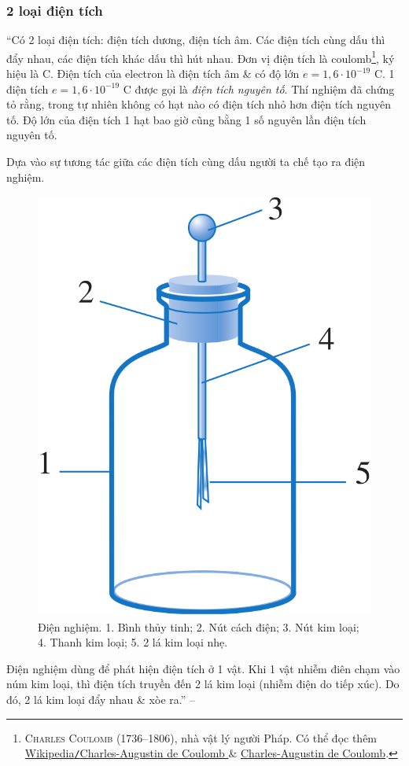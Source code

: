 \documentclass[oneside]{book}
\numberwithin{equation}{section}
\begin{document}
\subsubsection{2 loại điện tích}
``Có 2 loại điện tích: điện tích dương, điện tích âm. Các điện tích cùng dấu thì đẩy nhau, các điện tích khác dấu thì hút nhau. Đơn vị điện tích là coulomb\footnote{\textsc{Charles Coulomb} (1736--1806), nhà vật lý người Pháp. Có thể đọc thêm \href{https://vi.wikipedia.org/wiki/Charles-Augustin_de_Coulomb}{Wikipedia\texttt{/}Charles-Augustin de Coulomb
} \& \href{https://en.wikipedia.org/wiki/Charles-Augustin_de_Coulomb}{Charles-Augustin de Coulomb}.}, ký hiệu là C. Điện tích của electron là điện tích âm \& có độ lớn $e = 1,6\cdot 10^{-19}$ C. 1 điện tích $e = 1,6\cdot 10^{-19}$ C được gọi là \textit{điện tích nguyên tố}. Thí nghiệm đã chứng tỏ rằng, trong tự nhiên không có hạt nào có điện tích nhỏ hơn điện tích nguyên tố. Độ lớn của điện tích 1 hạt bao giờ cũng bằng 1 số nguyên lần điện tích nguyên tố.

Dựa vào sự tương tác giữa các điện tích cùng dấu người ta chế tạo ra điện nghiệm.

\begin{figure}[H]
	\centering
	\includegraphics[scale=0.15]{dien_nghiem}
	\caption{Điện nghiệm. 1. Bình thủy tinh; 2. Nút cách điện; 3. Nút kim loại; 4. Thanh kim loại; 5. 2 lá kim loại nhẹ. \cite[Hình 1.1, p. 6]{SGK_Vat_Ly_11_nang_cao}}
\end{figure}
Điện nghiệm dùng để phát hiện điện tích ở 1 vật. Khi 1 vật nhiễm điên chạm vào núm kim loại, thì điện tích truyền đến 2 lá kim loại (nhiễm điện do tiếp xúc). Do đó, 2 lá kim loại đẩy nhau \& xòe ra.'' -- \cite[p. 6]{SGK_Vat_Ly_11_nang_cao}
\end{document}
